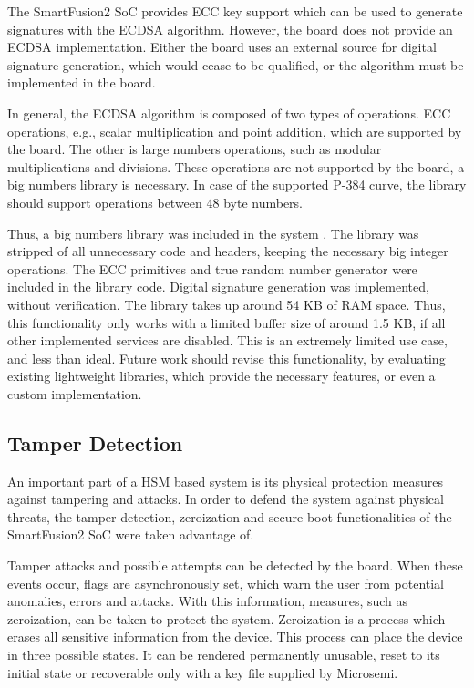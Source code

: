 The SmartFusion2 SoC provides ECC key support which can be used to generate signatures with the ECDSA algorithm. However, the board does not provide an ECDSA implementation. Either the board uses an external source for digital signature generation, which would cease to be qualified, or the algorithm must be implemented in the board.

In general, the ECDSA algorithm is composed of two types of operations. ECC operations, e.g., scalar multiplication and point addition, which are supported by the board. The other is large numbers operations, such as modular multiplications and divisions. These operations are not supported by the board, a big numbers library is necessary. In case of the supported P-384 curve, the library should support operations between 48 byte numbers. 

Thus, a big numbers library was included in the system \cite{libecc}. The library was stripped of all unnecessary code and headers, keeping the necessary big integer operations. The ECC primitives and true random number generator were included in the library code. Digital signature generation was implemented, without verification. The library takes up around 54 KB of RAM space. Thus, this functionality only works with a limited buffer size of around 1.5 KB, if all other implemented services are disabled.
This is an extremely limited use case, and less than ideal. Future work should revise this functionality, by evaluating existing lightweight libraries, which provide the necessary features, or even a custom implementation.

\subsection{Tamper Detection}\label{chap:implementation:services:tamper-detection}

An important part of a HSM based system is its physical protection measures against tampering and attacks.
In order to defend the system against physical threats, the tamper detection, zeroization and secure boot functionalities of the SmartFusion2 SoC were taken advantage of.

Tamper attacks and possible attempts can be detected by the board. When these events occur, flags are asynchronously set, which warn the user from potential anomalies, errors and attacks. With this information, measures, such as zeroization, can be taken to protect the system.
Zeroization is a process which erases all sensitive information from the device. This process can place the device in three possible states. It can be rendered permanently unusable, reset to its initial state or recoverable only with a key file supplied by Microsemi.

